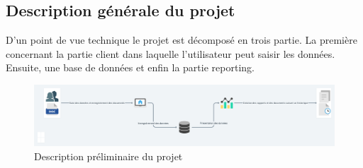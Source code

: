 \documentclass[a4paper]{report}
\begin{document}
\begin{doublespace}
    \subsection{Description générale du projet}
    D'un point de vue technique le projet est décomposé en trois partie. La
    première concernant la partie client dans laquelle l'utilisateur peut saisir
    les données. Ensuite, une base de données et enfin la partie reporting.
    \begin{figure}[H]
        \begin{center}
            \includegraphics[scale=0.2]{images/pre-descip-projet.png}
            \caption{Description préliminaire du projet}
        \end{center}
    \end{figure}

\end{doublespace}
\end{document}
